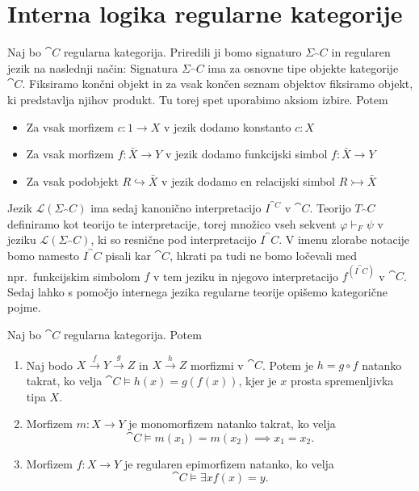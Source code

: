\documentclass[../kategoricna_logika.tex]{subfiles}
\begin{document}
\section{Interna logika regularne kategorije}
Naj bo $\cat{C}$ regularna kategorija.
Priredili ji bomo signaturo $\Sigma_\cat{C}$ in regularen jezik na naslednji način:
Signatura $\Sigma_\cat{C}$ ima za osnovne tipe objekte kategorije $\cat{C}$.
Fiksiramo končni objekt in za vsak končen seznam objektov fiksiramo objekt, ki predstavlja njihov produkt.
Tu torej spet uporabimo aksiom izbire. Potem
\begin{itemize}
  \item Za vsak morfizem $c : 1 \to X$ v jezik dodamo konstanto $c:X$
  \item Za vsak morfizem $f : \bar{X} \to Y$ v jezik dodamo funkcijski simbol $f : \bar{X} \to Y$
  \item Za vsak podobjekt $R \hookrightarrow \bar{X}$ v jezik dodamo en relacijski simbol
    ${R \rightarrowtail \bar{X}}$
\end{itemize}
Jezik $\mathcal{L}(\Sigma_\cat{C})$ ima sedaj kanonično interpretacijo $I^{\cat{C}}$ v $\cat{C}$.
Teorijo $T_\cat{C}$ definiramo kot teorijo te interpretacije, torej množico vseh sekvent
$\varphi \vdash_F \psi$ v jeziku $\mathcal{L}(\Sigma_\cat{C})$, ki so resnične pod interpretacijo $I^\cat{C}$.
V imenu zlorabe notacije bomo namesto $I^\cat{C}$ pisali kar $\cat{C}$, 
hkrati pa tudi ne bomo ločevali med npr.\ funkcijskim simbolom $f$ v tem jeziku in njegovo interpretacijo $f^{(I^\cat{C})}$ v $\cat{C}$.
Sedaj lahko s pomočjo internega jezika regularne teorije opišemo kategorične pojme.
\begin{lema}\label{lema:morfizmi-v-interni-logiki}
  Naj bo $\cat{C}$ regularna kategorija. Potem
  \begin{enumerate}[label=(\roman*)]
    \item Naj bodo $X \xrightarrow{f} Y \xrightarrow{g} Z$ in $X \xrightarrow{h} Z$ morfizmi v $\cat{C}$.
      Potem je $h = g \circ f$ natanko takrat, ko velja ${\cat{C} \models h(x) = g(f(x))}$,
      kjer je $x$ prosta spremenljivka tipa $X$.
    \item Morfizem $m : X \to Y$ je monomorfizem natanko takrat, ko velja
      \[\cat{C} \models m(x_1) = m(x_2) \implies x_1 = x_2. \]
    \item Morfizem $f : X \to Y$ je regularen epimorfizem natanko, ko velja
      \[ \cat{C} \models \exists x f(x) = y. \]
  \end{enumerate}
\end{lema}
\end{document}
